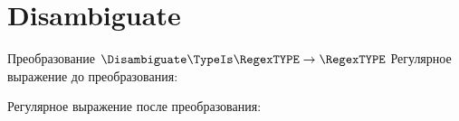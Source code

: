 \section{Disambiguate}
\begin{frame}{Преобразование $\Disambiguate\TypeIs\RegexTYPE\to\RegexTYPE$}
	Регулярное выражение до преобразования:

	Регулярное выражение после преобразования:

	
\end{frame}

